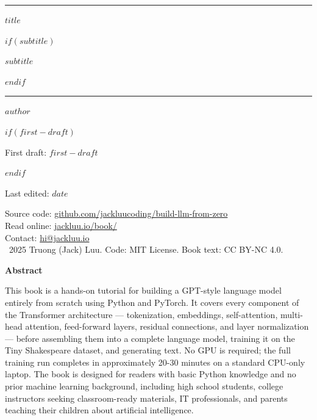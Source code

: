 \documentclass[11pt,oneside]{book}
\begin{document}
\begin{titlepage}
  \vspace*{2cm}
  {\color{tealcolor}\rule{\linewidth}{3pt}}
  \vspace{1cm}

  {\fontsize{32}{38}\selectfont\bfseries $title$\par}
  \vspace{0.5cm}

  $if(subtitle)$
  {\fontsize{16}{20}\selectfont\color{gray} $subtitle$\par}
  \vspace{1cm}
  $endif$

  {\color{tealcolor}\rule{\linewidth}{1pt}}
  \vspace{1.5cm}

  {\large $author$\par}
  \vspace{0.3cm}
  $if(first-draft)$
  {\color{gray}\small First draft: $first-draft$\par}
  \vspace{0.15cm}
  $endif$
  {\color{gray}\small Last edited: $date$\par}

  \vfill
  {\small\color{gray}
    Source code: \href{https://github.com/jackluucoding/build-llm-from-zero}{github.com/jackluucoding/build-llm-from-zero}\\
    Read online: \href{https://jackluu.io/book/}{jackluu.io/book/}\\
    Contact: \href{mailto:hi@jackluu.io}{hi@jackluu.io}\\[6pt]
    \textcopyright\ 2025 Truong (Jack) Luu.
    Code: MIT License. Book text: CC BY-NC 4.0.
  }
  \restoregeometry
\end{titlepage}

\clearpage
\thispagestyle{empty}
\vspace*{3cm}
{\large\bfseries Abstract}
\vspace{0.5em}

\noindent
This book is a hands-on tutorial for building a GPT-style language model entirely from scratch
using Python and PyTorch. It covers every component of the Transformer architecture —
tokenization, embeddings, self-attention, multi-head attention, feed-forward layers, residual
connections, and layer normalization — before assembling them into a complete language model,
training it on the Tiny Shakespeare dataset, and generating text. No GPU is required; the full
training run completes in approximately 20-30 minutes on a standard CPU-only laptop. The book
is designed for readers with basic Python knowledge and no prior machine learning background,
including high school students, college instructors seeking classroom-ready materials, IT
professionals, and parents teaching their children about artificial intelligence.
\end{document}
